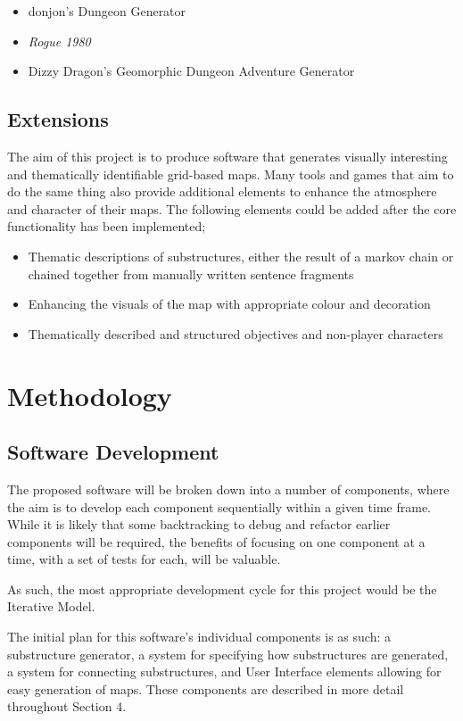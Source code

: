 \documentclass{article}
\begin{document}
\begin{itemize}
    \item donjon's Dungeon Generator
    \item \textit{Rogue 1980}
    \item Dizzy Dragon's Geomorphic Dungeon Adventure Generator
\end{itemize}

\subsection{Extensions}
The aim of this project is to produce software that generates visually interesting and thematically identifiable grid-based maps. Many tools and games that aim to do the same thing also provide additional elements to enhance the atmosphere and character of their maps. The following elements could be added after the core functionality has been implemented;

\begin{itemize}
    \item Thematic descriptions of substructures, either the result of a markov chain or chained together from manually written sentence fragments
    \item Enhancing the visuals of the map with appropriate colour and decoration
    \item Thematically described and structured objectives and non-player characters
\end{itemize}

\section{Methodology}
\subsection{Software Development}
The proposed software will be broken down into a number of components, where the aim is to develop each component sequentially within a given time frame. While it is likely that some backtracking to debug and refactor earlier components will be required, the benefits of focusing on one component at a time, with a set of tests for each, will be valuable.

As such, the most appropriate development cycle for this project would be the Iterative Model.

The initial plan for this software's individual components is as such: a substructure generator, a system for specifying how substructures are generated, a system for connecting substructures, and User Interface elements allowing for easy generation of maps. These components are described in more detail throughout Section 4.
\end{document}
